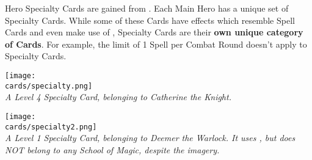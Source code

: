 \begin{multicols*}{2}
\pagebreak
{}

Hero Specialty Cards are gained from .
Each Main Hero has a unique set of Specialty Cards.
While some of these Cards have effects which resemble Spell Cards and even make use of , Specialty Cards are their \textbf{own unique category of Cards}.
For example, the limit of 1 Spell per Combat Round doesn't apply to Specialty Cards.

{
    \medskip
    \centering
    \texttt{[image: \\cards/specialty.png]}\\
    \medskip
    \footnotesize\textit{A Level 4 Specialty Card, belonging to Catherine the Knight.}
}

{
    \medskip
    \centering
    \texttt{[image: \\cards/specialty2.png]}\\
    \medskip
    \footnotesize\textit{A Level 1 Specialty Card, belonging to Deemer the Warlock. It uses , but does NOT belong to any School of Magic, despite the imagery.}
}

\columnbreak
{}


\end{multicols*}
